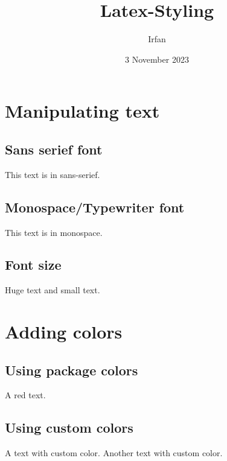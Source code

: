 \documentclass{article}
\title{Latex-Styling}
\author{Irfan}
\date{3 November 2023}
\begin{document}
  \maketitle

  \section{Manipulating text}
    \subsection{Sans serief font}
    {\sffamily This text is in sans-serief.}

    \subsection{Monospace/Typewriter font}
    {\ttfamily This text is in monospace.}

    \subsection{Font size}
    {\huge Huge} text and {\small small} text.

  \section{Adding colors}
    \subsection{Using package colors}
      {\color{red} A red text.}

    \subsection{Using custom colors}
      \textcolor{myColor1}{A text with custom color.}
      \newline
      \textcolor{myColor2}{Another text with custom color.}
\end{document}
